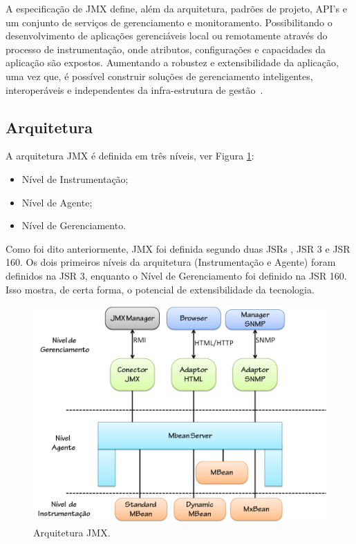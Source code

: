 A especificação de JMX define, além da arquitetura, padrões de projeto, API's e um conjunto de serviços de gerenciamento e monitoramento. Possibilitando o desenvolvimento de aplicações gerenciáveis local ou remotamente através do processo de instrumentação, onde atributos, configurações e capacidades da aplicação são expostos. Aumentando a robustez e extensibilidade da aplicação, uma vez que, é possível construir soluções de gerenciamento inteligentes, interoperáveis e independentes da infra-estrutura de gestão~\cite{jmx}.

\subsection{Arquitetura}
\label{subsec:arch}
A arquitetura JMX é definida em três níveis, ver Figura \ref{fig:arch_jmx}:

\begin{itemize}
 \item Nível de Instrumentação;
 \item Nível de Agente;
 \item Nível de Gerenciamento.
\end{itemize}

Como foi dito anteriormente, JMX foi definida segundo duas JSRs , JSR 3 e JSR 160. Os dois primeiros níveis da arquitetura (Instrumentação e Agente) foram definidos na JSR 3, enquanto o Nível de Gerenciamento foi definido na JSR 160. Isso mostra, de certa forma, o potencial de extensibilidade da tecnologia.

\begin{figure}[htp]
\centering
\includegraphics[width=12cm]{chapters/chapter4/arch_jmx.png}
\caption[Arquitetura JMX]{Arquitetura JMX.}
\label{fig:arch_jmx}
\end{figure}

